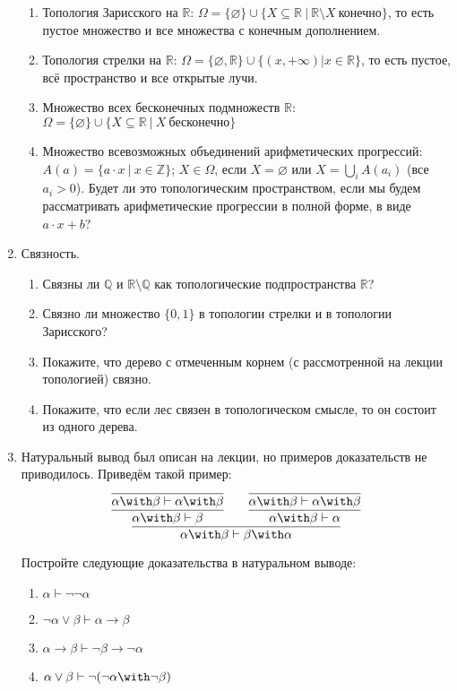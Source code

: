\documentclass[10pt,a4paper,oneside]{article}
\begin{document}
\begin{enumerate}
\begin{enumerate}
\item Топология Зарисского на $\mathbb{R}$: 
$\Omega = \{\varnothing\} \cup \{ X \subseteq \mathbb{R}\ |\ \mathbb{R} \setminus X\ \text{конечно} \}$,
то есть пустое множество и все множества с конечным дополнением.
\item Топология стрелки на $\mathbb{R}$:
$\Omega = \{\varnothing, \mathbb{R}\} \cup \{ (x,+\infty) | x \in \mathbb{R} \}$, то есть пустое, 
всё пространство и все открытые лучи.
\item Множество всех бесконечных подмножеств $\mathbb{R}$:
$\Omega = \{\varnothing\} \cup \{ X \subseteq \mathbb{R}\ |\ X\ \text{бесконечно} \}$
\item Множество всевозможных объединений арифметических прогрессий:
$A(a) = \{ a\cdot x\ |\ x \in \mathbb{Z}\}$;
$X \in \Omega$, если $X=\varnothing$ или $X = \bigcup_i A(a_i)$ (все $a_i > 0$).
Будет ли это топологическим пространством, если мы будем рассматривать арифметические прогрессии
в полной форме, в виде $a \cdot x + b$?
\end{enumerate}



\item Связность.
\begin{enumerate}
\item Связны ли $\mathbb{Q}$ и $\mathbb{R}\setminus\mathbb{Q}$ как топологические подпространства $\mathbb{R}$?
\item Связно ли множество $\{0,1\}$ в топологии стрелки и в топологии Зарисского?
\item Покажите, что дерево с отмеченным корнем (с рассмотренной на лекции топологией) связно.
\item Покажите, что если лес связен в топологическом смысле, то он состоит из одного дерева.
\end{enumerate}

\item Натуральный вывод был описан на лекции, но примеров доказательств не приводилось. Приведём такой пример: 
$$\infer{\alpha\with\beta\vdash\beta\with\alpha}{
    \infer{\alpha\with\beta\vdash\beta}{\infer{\alpha\with\beta\vdash\alpha\with\beta}{}}\quad\quad
    \infer{\alpha\with\beta\vdash\alpha}{\infer{\alpha\with\beta\vdash\alpha\with\beta}{}}
  }$$

Постройте следующие доказательства в натуральном выводе:

\begin{enumerate}
\item $\alpha\vdash\neg\neg\alpha$
\item $\neg \alpha\vee \beta\vdash \alpha \rightarrow \beta$
\item $\alpha \rightarrow \beta \vdash \neg \beta \rightarrow \neg \alpha$
\item $\alpha \vee \beta \vdash \neg (\neg\alpha\with\neg\beta)$
\end{enumerate}


\end{enumerate}
\end{document}
